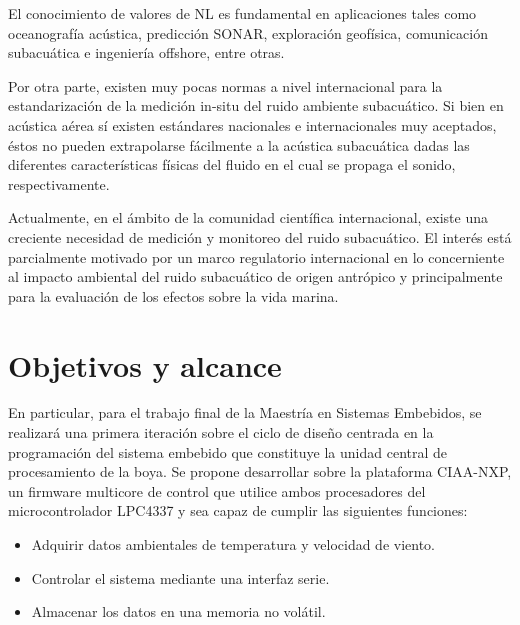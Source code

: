 
El conocimiento de valores de NL es fundamental en aplicaciones tales como oceanografía acústica, predicción SONAR, exploración geofísica, comunicación subacuática e ingeniería offshore, entre otras.

Por otra parte, existen muy pocas normas a nivel internacional para la estandarización de la medición in-situ del ruido ambiente subacuático. Si bien en acústica aérea sí existen estándares nacionales e internacionales muy aceptados, éstos no pueden extrapolarse fácilmente a la acústica subacuática dadas las diferentes características físicas del fluido en el cual se propaga el sonido, respectivamente.

Actualmente, en el ámbito de la comunidad científica internacional, existe una creciente necesidad de medición y monitoreo del ruido subacuático. El interés está parcialmente motivado por un marco regulatorio internacional en lo concerniente al impacto ambiental del ruido subacuático de origen antrópico y principalmente para la evaluación de los efectos sobre la vida marina.



\section{Objetivos y alcance}
\label{sec:objetivosyalcances}


En particular, para el trabajo final de la Maestría en Sistemas Embebidos, se realizará una primera iteración sobre el ciclo de diseño centrada en la programación del sistema embebido que constituye la unidad central de procesamiento de la boya.  Se propone desarrollar sobre la plataforma CIAA-NXP, un firmware multicore de control que utilice ambos procesadores del microcontrolador LPC4337 y sea capaz de cumplir las siguientes funciones:

\begin{itemize}
	\item Adquirir datos ambientales de temperatura y velocidad de viento.
	\item Controlar el sistema mediante una interfaz serie.
	\item Almacenar los datos en una memoria no volátil.
\end{itemize}

